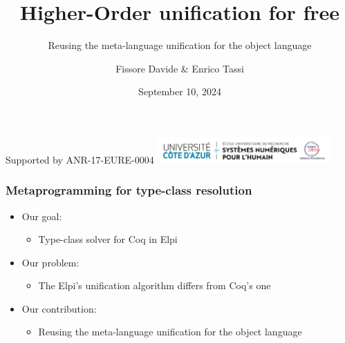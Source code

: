 \documentclass{pres}
\author{Fissore Davide \& Enrico Tassi}
\title{Higher-Order unification for free}
\subtitle{Reusing the meta-language unification for the object language}
\date{September 10, 2024}
\newcommand{\sepFrame}[1]{
  \section{#1}
  \begin{frame}
    \centering
    {\usebeamerfont*{frametitle}\usebeamercolor[fg]{frametitle} #1}
  \end{frame}
}
\begin{document}


\begin{frame}
  \titlepage
  \tiny Supported by ANR-17-EURE-0004 \hfill \includegraphics[height=1cm,valign=c]{UCA_DS4H_France2030.png}
\end{frame}





\begin{frame}[fragile]
  \frametitle{Metaprogramming for type-class resolution}

  \begin{itemize}
    \item Our goal:
          \begin{itemize}
            \item Type-class solver for Coq in Elpi
          \end{itemize}
    \item Our problem:
          \begin{itemize}
            \item The Elpi's unification algorithm differs from Coq's one
          \end{itemize}
    \item Our contribution:
          \begin{itemize}
            \item Reusing the meta-language unification for the object language
          \end{itemize}
  \end{itemize}

\end{frame}
\end{document}

